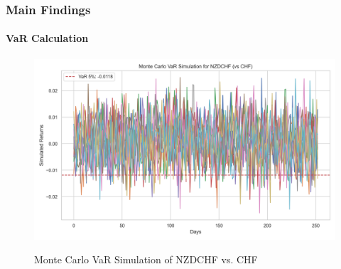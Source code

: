 \documentclass[10pt]{beamer}
\begin{document}
\begin{frame}
\frametitle{Main Findings}
\framesubtitle{VaR Calculation}
\begin{figure}[h]
    \centering     \includegraphics[width=0.9\linewidth]{../../reports/figures/monte_carlo_var_simulation_NZDCHF_vs_CHF.png}   \label{fig:monte_carlo_var_simulation_NZDCHF_vs_CHF}
\caption{\footnotesize Monte Carlo VaR Simulation of NZDCHF vs. CHF}
\end{figure}
\end{frame}
\end{document}

